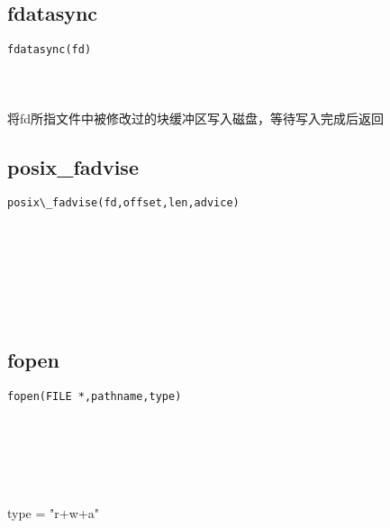 \documentclass[10pt,a4paper]{article}
\begin{document}
\subsection{fdatasync}
\begin{spacing}{2.0}
\lstset{language=C,numbers=none}
\begin{lstlisting}
fdatasync(fd)
\end{lstlisting}
{\large\color[rgb]{0.2,0.4,0.6}{fd:}}
\paragraph{ \ \ }将fd所指文件中被修改过的块缓冲区写入磁盘，等待写入完成后返回
\end{spacing}

\subsection{posix\_fadvise}
\begin{spacing}{2.0}
\lstset{language=C,numbers=none}
\begin{lstlisting}
posix\_fadvise(fd,offset,len,advice)
\end{lstlisting}
{\large\color[rgb]{0.2,0.4,0.6}{fd:}} \\
{\large\color[rgb]{0.2,0.4,0.6}{offset:}} \\
{\large\color[rgb]{0.2,0.4,0.6}{len:}} \\
{\large\color[rgb]{0.2,0.4,0.6}{advice:}}
\paragraph{ \ \ }
\end{spacing}

\section{\color[rgb]{0.2,0.4,0.6}{文件IO}}
\subsection{fopen}
\begin{spacing}{2.0}
\lstset{language=C,numbers=none}
\begin{lstlisting}
fopen(FILE *,pathname,type)
\end{lstlisting}
{\large\color[rgb]{0.2,0.4,0.6}{*:}} \\
{\large\color[rgb]{0.2,0.4,0.6}{pathname:}} \\
{\large\color[rgb]{0.2,0.4,0.6}{type:}}
\paragraph{ \ \ }type = "r+w+a"
\end{spacing}
\end{document}
